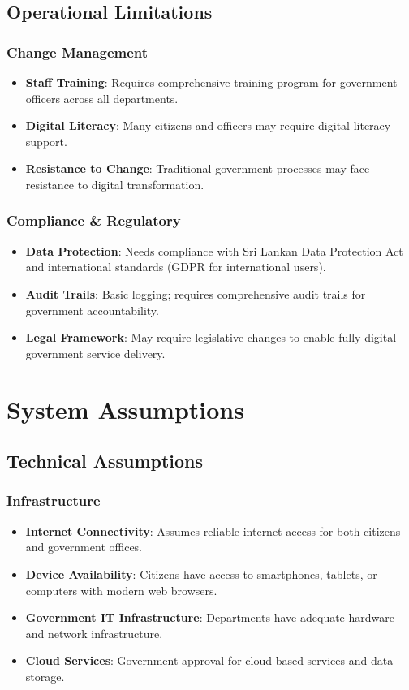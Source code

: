 \documentclass[12pt,a4paper]{article}
\begin{document}
\subsection{Operational Limitations}

\subsubsection{Change Management}
\begin{itemize}[leftmargin=*]
    \item \textbf{Staff Training}: Requires comprehensive training program for government officers across all departments.
    \item \textbf{Digital Literacy}: Many citizens and officers may require digital literacy support.
    \item \textbf{Resistance to Change}: Traditional government processes may face resistance to digital transformation.
\end{itemize}

\subsubsection{Compliance \& Regulatory}
\begin{itemize}[leftmargin=*]
    \item \textbf{Data Protection}: Needs compliance with Sri Lankan Data Protection Act and international standards (GDPR for international users).
    \item \textbf{Audit Trails}: Basic logging; requires comprehensive audit trails for government accountability.
    \item \textbf{Legal Framework}: May require legislative changes to enable fully digital government service delivery.
\end{itemize}

\section{System Assumptions}

\subsection{Technical Assumptions}

\subsubsection{Infrastructure}
\begin{itemize}[leftmargin=*]
    \item \textbf{Internet Connectivity}: Assumes reliable internet access for both citizens and government offices.
    \item \textbf{Device Availability}: Citizens have access to smartphones, tablets, or computers with modern web browsers.
    \item \textbf{Government IT Infrastructure}: Departments have adequate hardware and network infrastructure.
    \item \textbf{Cloud Services}: Government approval for cloud-based services and data storage.
\end{itemize}
\end{document}
